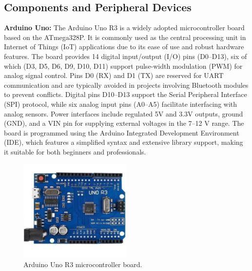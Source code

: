 \documentclass[conference, onecolumn]{IEEEtran}
\begin{document}
\subsection{Components and Peripheral Devices}
	 \textbf{Arduino Uno:} The Arduino Uno R3 is a widely adopted microcontroller board based on the ATmega328P. It is commonly used as the central processing unit in Internet of Things (IoT) applications due to its ease of use and robust hardware features. The board provides 14 digital input/output (I/O) pins (D0–D13), six of which (D3, D5, D6, D9, D10, D11) support pulse-width modulation (PWM) for analog signal control.
	Pins D0 (RX) and D1 (TX) are reserved for UART communication and are typically avoided in projects involving Bluetooth modules to prevent conflicts. Digital pins D10–D13 support the Serial Peripheral Interface (SPI) protocol, while six analog input pins (A0–A5) facilitate interfacing with analog sensors. Power interfaces include regulated 5V and 3.3V outputs, ground (GND), and a VIN pin for supplying external voltages in the 7–12 V range.
	The board is programmed using the Arduino Integrated Development Environment (IDE), which features a simplified syntax and extensive library support, making it suitable for both beginners and professionals.
	
	\begin{figure}[H]
		\centering
		\includegraphics[width=0.5\textwidth]{UNOR3.pdf}
		\caption{Arduino Uno R3 microcontroller board.}
		\label{fig3}
	\end{figure}
\end{document}
